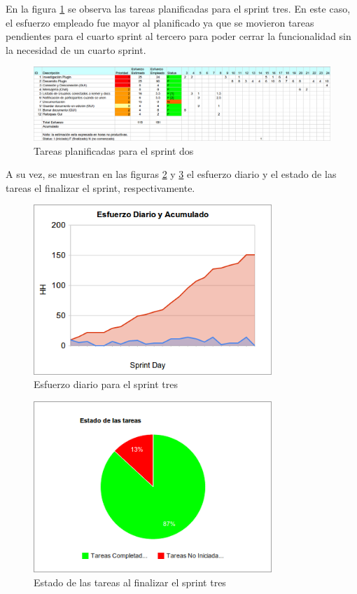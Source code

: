 \documentclass[12pt,a4paper]{article}
\begin{document}
En la figura \ref{sprint3-tareas} se observa las tareas planificadas para el sprint tres. En este caso, el esfuerzo empleado
fue mayor al planificado ya que se movieron tareas pendientes para el cuarto sprint al tercero para poder cerrar la funcionalidad
sin la necesidad de un cuarto sprint.

	\begin{figure}[!ht]
		\begin{center}
			\includegraphics[width=14cm]{sprint3.png}
			\caption{\label{sprint3-tareas} Tareas planificadas para el sprint dos }
		\end{center}
	\end{figure}

A su vez, se muestran en las figuras \ref{sprint3-esfuerzo} y \ref{sprint3-tareas-fin} el esfuerzo diario y el estado
de las tareas el finalizar el sprint, respectivamente.

	\begin{figure}[!ht]
		\begin{center}
			\includegraphics[width=9cm]{sprint3-esfuerzo-diario.png}
			\caption{\label{sprint3-esfuerzo} Esfuerzo diario para el sprint tres }
		\end{center}
	\end{figure}

	\begin{figure}[!ht]
		\begin{center}
			\includegraphics[width=9cm]{sprint3-tareas.png}
			\caption{\label{sprint3-tareas-fin} Estado de las tareas al finalizar el sprint tres }
		\end{center}
	\end{figure}
\end{document}
